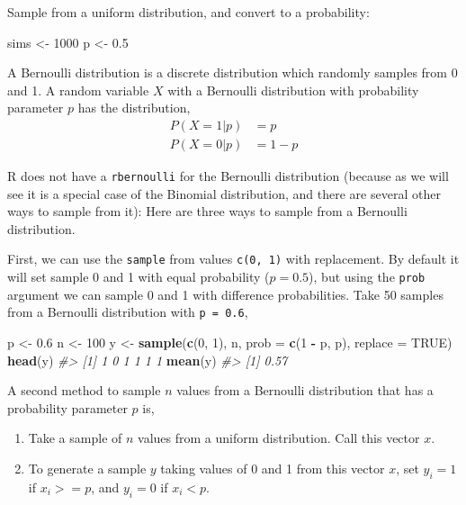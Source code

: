 \documentclass[]{book}
\newenvironment{Shaded}{\begin{snugshade}}{\end{snugshade}}
\newcommand{\KeywordTok}[1]{\textcolor[rgb]{0.13,0.29,0.53}{\textbf{#1}}}
\newcommand{\DataTypeTok}[1]{\textcolor[rgb]{0.13,0.29,0.53}{#1}}
\newcommand{\DecValTok}[1]{\textcolor[rgb]{0.00,0.00,0.81}{#1}}
\newcommand{\FloatTok}[1]{\textcolor[rgb]{0.00,0.00,0.81}{#1}}
\newcommand{\StringTok}[1]{\textcolor[rgb]{0.31,0.60,0.02}{#1}}
\newcommand{\CommentTok}[1]{\textcolor[rgb]{0.56,0.35,0.01}{\textit{#1}}}
\newcommand{\OtherTok}[1]{\textcolor[rgb]{0.56,0.35,0.01}{#1}}
\newcommand{\OperatorTok}[1]{\textcolor[rgb]{0.81,0.36,0.00}{\textbf{#1}}}
\newcommand{\NormalTok}[1]{#1}
\providecommand{\tightlist}{%
  \setlength{\itemsep}{0pt}\setlength{\parskip}{0pt}}
\theoremstyle{definition}
\theoremstyle{definition}
\theoremstyle{definition}
\theoremstyle{remark}
\begin{document}
Sample from a uniform distribution, and convert to a probability:

\begin{Shaded}
\begin{Highlighting}[]
\NormalTok{sims <-}\StringTok{ }\DecValTok{1000}
\NormalTok{p <-}\StringTok{ }\FloatTok{0.5}
\end{Highlighting}
\end{Shaded}

A Bernoulli distribution is a discrete distribution which randomly
samples from 0 and 1. A random variable \(X\) with a Bernoulli
distribution with probability parameter \(p\) has the distribution, \[
\begin{aligned}
P(X = 1 | p) &= p \\
P(X = 0 | p) &= 1 - p
\end{aligned}
\]

R does not have a \texttt{rbernoulli} for the Bernoulli distribution
(because as we will see it is a special case of the Binomial
distribution, and there are several other ways to sample from it): Here
are three ways to sample from a Bernoulli distribution.

First, we can use the \texttt{sample} from values \texttt{c(0,\ 1)} with
replacement. By default it will set sample 0 and 1 with equal
probability (\(p = 0.5\)), but using the \texttt{prob} argument we can
sample 0 and 1 with difference probabilities. Take 50 samples from a
Bernoulli distribution with \texttt{p\ =\ 0.6},

\begin{Shaded}
\begin{Highlighting}[]
\NormalTok{p <-}\StringTok{ }\FloatTok{0.6}
\NormalTok{n <-}\StringTok{ }\DecValTok{100}
\NormalTok{y <-}\StringTok{ }\KeywordTok{sample}\NormalTok{(}\KeywordTok{c}\NormalTok{(}\DecValTok{0}\NormalTok{, }\DecValTok{1}\NormalTok{), n, }\DataTypeTok{prob =} \KeywordTok{c}\NormalTok{(}\DecValTok{1} \OperatorTok{-}\StringTok{ }\NormalTok{p, p), }\DataTypeTok{replace =} \OtherTok{TRUE}\NormalTok{)}
\KeywordTok{head}\NormalTok{(y)}
\CommentTok{#> [1] 1 0 1 1 1 1}
\KeywordTok{mean}\NormalTok{(y)}
\CommentTok{#> [1] 0.57}
\end{Highlighting}
\end{Shaded}

A second method to sample \(n\) values from a Bernoulli distribution
that has a probability parameter \(p\) is,

\begin{enumerate}
\def\labelenumi{\arabic{enumi}.}
\tightlist
\item
  Take a sample of \(n\) values from a uniform distribution. Call this
  vector \(x\).
\item
  To generate a sample \(y\) taking values of 0 and 1 from this vector
  \(x\), set \(y_i = 1\) if \(x_i >= p\), and \(y_i = 0\) if
  \(x_i < p\).
\end{enumerate}
\end{document}
